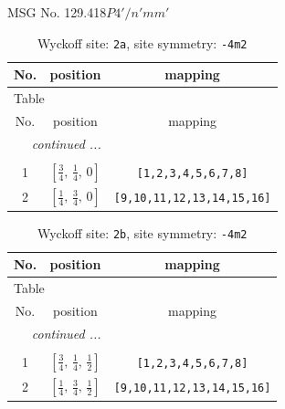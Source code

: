 \documentclass[fleqn,8pt]{jsarticle}
\begin{document}
\setcounter{MaxMatrixCols}{32}

\renewcommand{\tablename}{Table~}
\renewcommand{\figurename}{Figure~}
\begin{center}
\LARGE
MSG No. 129.418\quad$P4'/n'mm'$
\end{center}
\renewcommand{\arraystretch}{1.2}
\begin{longtable}{ccc}
\caption{Wyckoff site: {\tt 2a}, site symmetry: {\tt -4m2}}
 \\
 \hline \hline
No. & position & mapping \\ \hline \endfirsthead

\multicolumn{2}{l}{\tablename\ \thetable{}} \\
 \hline \hline
No. & position & mapping \\ \hline \endhead

 \hline \hline
\multicolumn{2}{r}{\footnotesize\it continued ...} \\ \endfoot

 \hline \hline
\multicolumn{2}{r}{} \\ \endlastfoot

1 & $\left[ \frac{3}{4},\, \frac{1}{4},\, 0 \right]$ & {\tt [1,2,3,4,5,6,7,8]} \\ \hline
2 & $\left[ \frac{1}{4},\, \frac{3}{4},\, 0 \right]$ & {\tt [9,10,11,12,13,14,15,16]} \\
\end{longtable}
\renewcommand{\arraystretch}{1.2}
\begin{longtable}{ccc}
\caption{Wyckoff site: {\tt 2b}, site symmetry: {\tt -4m2}}
 \\
 \hline \hline
No. & position & mapping \\ \hline \endfirsthead

\multicolumn{2}{l}{\tablename\ \thetable{}} \\
 \hline \hline
No. & position & mapping \\ \hline \endhead

 \hline \hline
\multicolumn{2}{r}{\footnotesize\it continued ...} \\ \endfoot

 \hline \hline
\multicolumn{2}{r}{} \\ \endlastfoot

1 & $\left[ \frac{3}{4},\, \frac{1}{4},\, \frac{1}{2} \right]$ & {\tt [1,2,3,4,5,6,7,8]} \\ \hline
2 & $\left[ \frac{1}{4},\, \frac{3}{4},\, \frac{1}{2} \right]$ & {\tt [9,10,11,12,13,14,15,16]} \\
\end{longtable}
\end{document}
